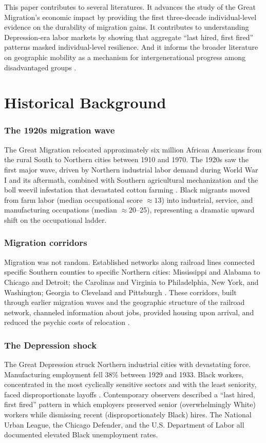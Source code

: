 \documentclass[12pt]{article}
\begin{document}
This paper contributes to several literatures. It advances the study of the Great Migration's economic impact \citep{boustan2017, derenoncourt2022, collins2014} by providing the first three-decade individual-level evidence on the durability of migration gains. It contributes to understanding Depression-era labor markets \citep{margo1993, sundstrom1992} by showing that aggregate ``last hired, first fired'' patterns masked individual-level resilience. And it informs the broader literature on geographic mobility as a mechanism for intergenerational progress among disadvantaged groups \citep{chetty2018}.


\section{Historical Background}

\subsubsection*{The 1920s migration wave} The Great Migration relocated approximately six million African Americans from the rural South to Northern cities between 1910 and 1970. The 1920s saw the first major wave, driven by Northern industrial labor demand during World War I and its aftermath, combined with Southern agricultural mechanization and the boll weevil infestation that devastated cotton farming \citep{boustan2017}. Black migrants moved from farm labor (median occupational score $\approx 13$) into industrial, service, and manufacturing occupations (median $\approx 20$--25), representing a dramatic upward shift on the occupational ladder.

\subsubsection*{Migration corridors} Migration was not random. Established networks along railroad lines connected specific Southern counties to specific Northern cities: Mississippi and Alabama to Chicago and Detroit; the Carolinas and Virginia to Philadelphia, New York, and Washington; Georgia to Cleveland and Pittsburgh \citep{boustan2010}. These corridors, built through earlier migration waves and the geographic structure of the railroad network, channeled information about jobs, provided housing upon arrival, and reduced the psychic costs of relocation \citep{collins2014}.

\subsubsection*{The Depression shock} The Great Depression struck Northern industrial cities with devastating force. Manufacturing employment fell 38\% between 1929 and 1933. Black workers, concentrated in the most cyclically sensitive sectors and with the least seniority, faced disproportionate layoffs \citep{sundstrom1992}. Contemporary observers described a ``last hired, first fired'' pattern in which employers preserved senior (overwhelmingly White) workers while dismissing recent (disproportionately Black) hires. The National Urban League, the Chicago Defender, and the U.S. Department of Labor all documented elevated Black unemployment rates.
\end{document}
